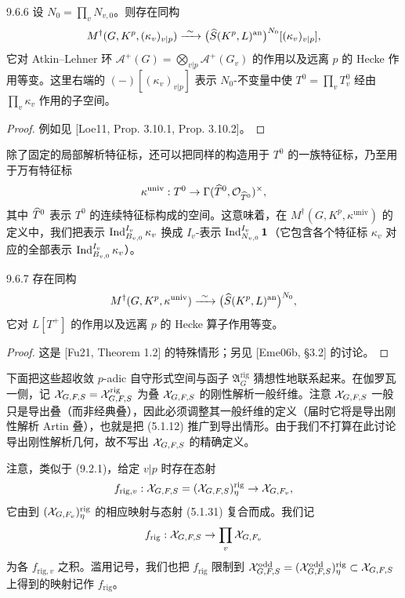 \begin{prop}{9.6.6}\label{prop:a4-16-9-6-6}
设 $N_0=\prod_vN_{v,0}$。则存在同构
\[
M^\dagger(G,K^p,(\kappa_v)_{v|p})\xrightarrow{\ \sim\ }\bigl(\widehat S(K^p,L)^{\mathrm{an}}\bigr)^{N_0}[(\kappa_v)_{v|p}],
\]
它对 Atkin--Lehner 环 $\mathcal A^+(G)=\bigotimes_{v|p}\mathcal A^+(G_v)$ 的作用以及远离 $p$ 的 Hecke 作用等变。这里右端的 $(-)[(\kappa_v)_{v|p}]$ 表示 $N_0$-不变量中使 $T^0=\prod_vT_v^0$ 经由 $\prod_v\kappa_v$ 作用的子空间。
\end{prop}

\begin{proof}
例如见 [Loe11, Prop. 3.10.1, Prop. 3.10.2]。
\end{proof}

除了固定的局部解析特征标，还可以把同样的构造用于 $T^0$ 的一族特征标，乃至用于万有特征标
\[
\kappa^{\mathrm{univ}}:T^0\to\Gamma(\widehat T^0,\mathcal{O}_{\widehat T^0})^\times,
\]
其中 $\widehat T^0$ 表示 $T^0$ 的连续特征标构成的空间。这意味着，在 $M^\dagger(G,K^p,\kappa^{\mathrm{univ}})$ 的定义中，我们把表示 $\operatorname{Ind}_{B_{v,0}}^{I_v}\kappa_v$ 换成 $I_v$-表示 $\operatorname{Ind}_{N_{v,0}}^{I_v}\mathbf 1$（它包含各个特征标 $\kappa_v$ 对应的全部表示 $\operatorname{Ind}_{B_{v,0}}^{I_v}\kappa_v$）。

\begin{prop}{9.6.7}\label{prop:a4-16-9-6-7}
存在同构
\[
M^\dagger(G,K^p,\kappa^{\mathrm{univ}})\xrightarrow{\ \sim\ }\bigl(\widehat S(K^p,L)^{\mathrm{an}}\bigr)^{N_0},
\]
它对 $L[T^+]$ 的作用以及远离 $p$ 的 Hecke 算子作用等变。
\end{prop}

\begin{proof}
这是 [Fu21, Theorem 1.2] 的特殊情形；另见 [Eme06b, §3.2] 的讨论。
\end{proof}

下面把这些超收敛 $p$-adic 自守形式空间与函子 $\mathfrak A_G^{\mathrm{rig}}$ 猜想性地联系起来。在伽罗瓦一侧，记 $\mathcal{X}_{G,F,S}=\mathcal{X}^{\mathrm{rig}}_{G,F,S}$ 为叠 $\mathcal{X}_{G,F,S}$ 的刚性解析一般纤维。注意 $\mathcal{X}_{G,F,S}$ 一般只是导出叠（而非经典叠），因此必须调整其一般纤维的定义（届时它将是导出刚性解析 Artin 叠），也就是把 (5.1.12) 推广到导出情形。由于我们不打算在此讨论导出刚性解析几何，故不写出 $\mathcal{X}_{G,F,S}$ 的精确定义。

注意，类似于 (9.2.1)，给定 $v|p$ 时存在态射
\[
f_{\mathrm{rig},v}:\mathcal{X}_{G,F,S}=(\mathcal{X}_{G,F,S})^{\mathrm{rig}}_\eta\to\mathcal{X}_{G,F_v},
\]
它由到 $(\mathcal{X}_{G,F_v})^{\mathrm{rig}}_\eta$ 的相应映射与态射 (5.1.31) 复合而成。我们记
\[
f_{\mathrm{rig}}:\mathcal{X}_{G,F,S}\to\prod_v\mathcal{X}_{G,F_v}
\]
为各 $f_{\mathrm{rig},v}$ 之积。滥用记号，我们也把 $f_{\mathrm{rig}}$ 限制到 $\mathcal{X}^{\mathrm{odd}}_{G,F,S}=(\mathcal{X}^{\mathrm{odd}}_{G,F,S})^{\mathrm{rig}}_\eta\subset\mathcal{X}_{G,F,S}$ 上得到的映射记作 $f_{\mathrm{rig}}$。


